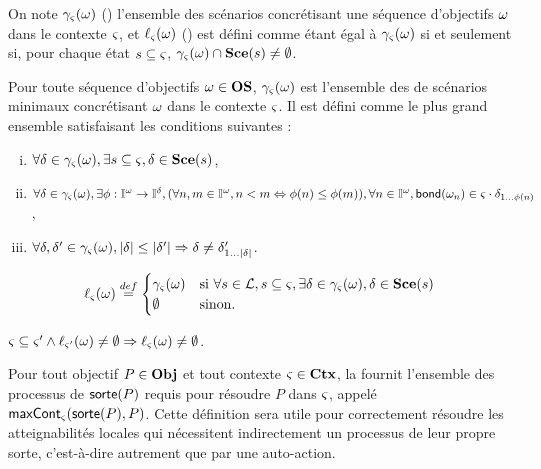 On note $\gamma_\varsigma(\omega)$ () l'ensemble des scénarios concrétisant
une séquence d'objectifs $\omega$ dans le contexte $\varsigma$,
et $\ell_\varsigma(\omega)$ () est défini comme étant égal à $\gamma_\varsigma(\omega)$ si et seulement si,
pour chaque état $s \subseteq \varsigma$,
$\gamma_\varsigma(\omega) \cap \mathbf{Sce}(s) \neq \emptyset$.

\begin{definition}[$\concr : \OS \to \powerset(\Sce)$]
  Pour toute séquence d'objectifs $\omega \in \mathbf{OS}$, $\gamma_\varsigma(\omega)$ est l'ensemble des
  de scénarios minimaux concrétisant $\omega$ dans le contexte $\varsigma$.
  Il est défini comme le plus grand ensemble satisfaisant les conditions suivantes :
  \begin{enumerate}[(i)]
  \item $\forall \delta \in \gamma_\varsigma(\omega), \exists s \subseteq \varsigma, \delta \in \mathbf{Sce}(s)$,
  \item $\forall \delta \in \gamma_\varsigma(\omega), \exists \phi : \mathbb{I}^{\omega} \to \mathbb{I}^{\delta},
      (\forall n, m \in \mathbb{I}^{\omega}, n < m \Leftrightarrow \phi(n) \leq \phi(m)),
      \forall n \in \mathbb{I}^{\omega}, \mathsf{bond}(\omega_n) \in \varsigma \cdot \delta_{1 \ldots \phi(n)}$,
  \item $\forall \delta, \delta' \in \gamma_\varsigma(\omega),
      |\delta| \leq |\delta'| \Rightarrow \delta \neq \delta'_{1 \ldots |\delta|}$.
  \end{enumerate}
\end{definition}

\begin{definition}[$\uconcr : \OS \to \powerset(\Sce)$]
  \[ \ell_\varsigma(\omega) \stackrel{def}=
    \begin{cases}
      \gamma_\varsigma(\omega) & \text{si } \forall s \in \mathcal{L}, s \subseteq \varsigma, \exists \delta \in \gamma_\varsigma(\omega),
        \delta \in \mathbf{Sce}(s) \\
      \emptyset & \text{sinon.}
    \end{cases} \]
\end{definition}

\begin{lemma}
  $\varsigma \subseteq \varsigma' \wedge \ell_{\varsigma'}(\omega) \neq \emptyset \Rightarrow
    \ell_{\varsigma}(\omega) \neq \emptyset$.
\end{lemma}

Pour tout objectif $P \in \mathbf{Obj}$ et tout contexte $\varsigma \in \mathbf{Ctx}$, la 
fournit l'ensemble des processus de $\mathsf{sorte}(P)$ requis pour résoudre $P$ dans $\varsigma$,
appelé $\mathsf{maxCont}_\varsigma(\mathsf{sorte}(P), P)$.
Cette définition sera utile pour correctement résoudre les atteignabilités locales
qui nécessitent indirectement un processus de leur propre sorte,
c'est-à-dire autrement que par une auto-action.

